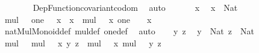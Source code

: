 \begin{isabellebody}
\ \ \ \ \ \ \isamarkupfalse%
\ Dep{\isacharunderscore}{\kern0pt}Function{\isacharunderscore}{\kern0pt}covariant{\isacharunderscore}{\kern0pt}codom\ \isamarkupfalse%
\ auto\isanewline
\ \ \isamarkupfalse%
\isanewline
{}\isamarkupfalse%
\isanewline
\ \ \isamarkupfalse%
\ x\ \isamarkupfalse%
\ {\isachardoublequoteopen}x\ {\isacharcolon}{\kern0pt}\ Nat{\isachardoublequoteclose}\isanewline
\ \ \isamarkupfalse%
\ {\isachardoublequoteopen}mul\ {\isacharparenleft}{\kern0pt}{\isasymnat}{\isacharcomma}{\kern0pt}\ {\isacharasterisk}{\kern0pt}{\isacharparenright}{\kern0pt}\ {\isacharparenleft}{\kern0pt}one\ {\isacharparenleft}{\kern0pt}{\isasymnat}{\isacharcomma}{\kern0pt}\ {\isacharasterisk}{\kern0pt}{\isacharparenright}{\kern0pt}{\isacharparenright}{\kern0pt}\ x\ {\isacharequal}{\kern0pt}\ x{\isachardoublequoteclose}\ \ {\isachardoublequoteopen}mul\ {\isacharparenleft}{\kern0pt}{\isasymnat}{\isacharcomma}{\kern0pt}\ {\isacharasterisk}{\kern0pt}{\isacharparenright}{\kern0pt}\ x\ {\isacharparenleft}{\kern0pt}one\ {\isacharparenleft}{\kern0pt}{\isasymnat}{\isacharcomma}{\kern0pt}\ {\isacharasterisk}{\kern0pt}{\isacharparenright}{\kern0pt}{\isacharparenright}{\kern0pt}\ {\isacharequal}{\kern0pt}\ x{\isachardoublequoteclose}\isanewline
\ \ \ \ \isamarkupfalse%
\ nat{\isacharunderscore}{\kern0pt}Mul{\isacharunderscore}{\kern0pt}Monoid{\isacharunderscore}{\kern0pt}def\ mul{\isacharunderscore}{\kern0pt}def\ one{\isacharunderscore}{\kern0pt}def\ \isamarkupfalse%
\ auto\isanewline
\isanewline
\ \ \isamarkupfalse%
\ y\ z\ \isamarkupfalse%
\ {\isachardoublequoteopen}y\ {\isacharcolon}{\kern0pt}\ Nat{\isachardoublequoteclose}\ {\isachardoublequoteopen}z\ {\isacharcolon}{\kern0pt}\ Nat{\isachardoublequoteclose}\isanewline
\ \ \isamarkupfalse%
\ {\isachardoublequoteopen}mul\ {\isacharparenleft}{\kern0pt}{\isasymnat}{\isacharcomma}{\kern0pt}\ {\isacharasterisk}{\kern0pt}{\isacharparenright}{\kern0pt}\ {\isacharparenleft}{\kern0pt}mul\ {\isacharparenleft}{\kern0pt}{\isasymnat}{\isacharcomma}{\kern0pt}\ {\isacharasterisk}{\kern0pt}{\isacharparenright}{\kern0pt}\ x\ y{\isacharparenright}{\kern0pt}\ z\ {\isacharequal}{\kern0pt}\ mul\ {\isacharparenleft}{\kern0pt}{\isasymnat}{\isacharcomma}{\kern0pt}\ {\isacharasterisk}{\kern0pt}{\isacharparenright}{\kern0pt}\ x\ {\isacharparenleft}{\kern0pt}mul\ {\isacharparenleft}{\kern0pt}{\isasymnat}{\isacharcomma}{\kern0pt}\ {\isacharasterisk}{\kern0pt}{\isacharparenright}{\kern0pt}\ y\ z{\isacharparenright}{\kern0pt}{\isachardoublequoteclose}\isanewline

\end{isabellebody}

